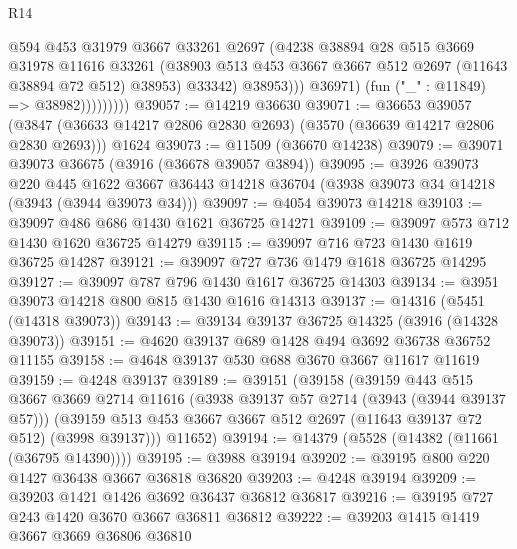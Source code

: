 \begin{lexlean}{R14}
\begin{coremodule}
                            @594
                            @453
                            @31979
                            @3667
                            @33261
                            @2697
                            (@4238
                              @38894
                              @28
                              @515
                              @3669
                              @31978
                              @11616
                              @33261
                              (@38903
                                @513
                                @453
                                @3667
                                @3667
                                @512
                                @2697
                                (@11643 @38894 @72 @512)
                                @38953)
                              @33342)
                            @38953)))
                      @36971)
                    (fun ("_" : @11849) => @38982)))))))))
@39057 := @14219 @36630
@39071 := @36653
    @39057
    (@3847 (@36633 @14217 @2806 @2830 @2693) (@3570 (@36639 @14217 @2806 @2830 @2693)))
    @1624
@39073 := @11509 (@36670 @14238)
@39079 := @39071 @39073 @36675 (@3916 (@36678 @39057 @3894))
@39095 := @3926
    @39073
    @220
    @445
    @1622
    @3667
    @36443
    @14218
    @36704
    (@3938 @39073 @34 @14218 (@3943 (@3944 @39073 @34)))
@39097 := @4054 @39073 @14218
@39103 := @39097 @486 @686 @1430 @1621 @36725 @14271
@39109 := @39097 @573 @712 @1430 @1620 @36725 @14279
@39115 := @39097 @716 @723 @1430 @1619 @36725 @14287
@39121 := @39097 @727 @736 @1479 @1618 @36725 @14295
@39127 := @39097 @787 @796 @1430 @1617 @36725 @14303
@39134 := @3951 @39073 @14218 @800 @815 @1430 @1616 @14313
@39137 := @14316 (@5451 (@14318 @39073))
@39143 := @39134 @39137 @36725 @14325 (@3916 (@14328 @39073))
@39151 := @4620 @39137 @689 @1428 @494 @3692 @36738 @36752 @11155
@39158 := @4648 @39137 @530 @688 @3670 @3667 @11617 @11619
@39159 := @4248 @39137
@39189 := @39151
    (@39158
      (@39159
        @443
        @515
        @3667
        @3669
        @2714
        @11616
        (@3938 @39137 @57 @2714 (@3943 (@3944 @39137 @57)))
        (@39159 @513 @453 @3667 @3667 @512 @2697 (@11643 @39137 @72 @512) (@3998 @39137)))
      @11652)
@39194 := @14379 (@5528 (@14382 (@11661 (@36795 @14390))))
@39195 := @3988 @39194
@39202 := @39195 @800 @220 @1427 @36438 @3667 @36818 @36820
@39203 := @4248 @39194
@39209 := @39203 @1421 @1426 @3692 @36437 @36812 @36817
@39216 := @39195 @727 @243 @1420 @3670 @3667 @36811 @36812
@39222 := @39203 @1415 @1419 @3667 @3669 @36806 @36810

\end{coremodule}
\end{lexlean}
